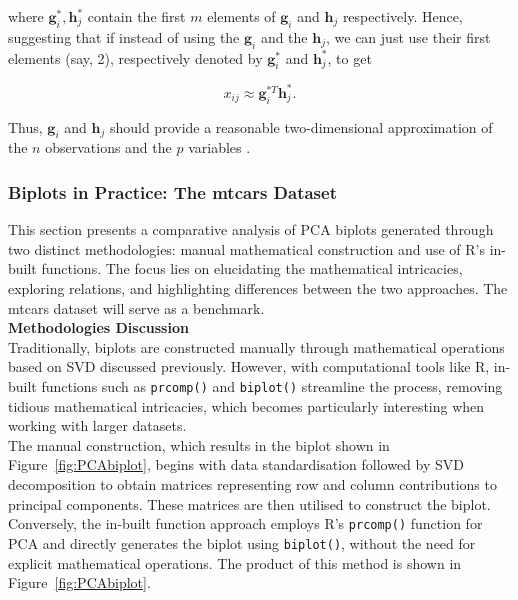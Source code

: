 \documentclass{article}\usepackage[]{graphicx}\usepackage[]{xcolor}
\numberwithin{equation}{section}
\begin{document}
\noindent where $\mathbf{g}^*_{i}, \mathbf{h}^*_{j}$ contain the first $m$ elements of $\mathbf{g}_i$ and $\mathbf{h}_j$ respectively. Hence, suggesting that if instead of using the $\mathbf{g}_i$ and the $\mathbf{h}_j$, we can just use their first elements (say, 2), respectively denoted by  $\mathbf{g}_{i}^{*}$  and  $\mathbf{h}_{j}^{*}$, to get

\[ x_{ij} \approx \mathbf{g}_{i}^{*T}\mathbf{h}_{j}^{*}.\]

\noindent Thus, $\mathbf{g}_i$ and $\mathbf{h}_j$ should provide a reasonable two-dimensional approximation of the $n$ observations and the $p$ variables \cite{jolliffe2003principal}.\\

\subsubsection{Biplots in Practice: The mtcars Dataset}

\noindent This section presents a comparative analysis of PCA biplots generated through two distinct methodologies: manual mathematical construction and use of R's in-built functions. The focus lies on elucidating the mathematical intricacies, exploring relations, and highlighting differences between the two approaches. The mtcars dataset will serve as a benchmark.\\

\noindent \textbf{Methodologies Discussion}\\
\noindent Traditionally, biplots are constructed manually through mathematical operations based on SVD discussed previously. However, with computational tools like R, in-built functions such as \texttt{prcomp()} and \texttt{biplot()} streamline the process, removing tidious mathematical intricacies, which becomes particularly interesting when working with larger datasets.\\

\noindent The manual construction, which results in the biplot shown in Figure~\ref{fig:PCAbiplot}, begins with data standardisation followed by SVD decomposition to obtain matrices representing row and column contributions to principal components. These matrices are then utilised to construct the biplot. Conversely, the in-built function approach employs R's \texttt{prcomp()} function for PCA and directly generates the biplot using \texttt{biplot()}, without the need for explicit mathematical operations. The product of this method is shown in Figure~\ref{fig:PCAbiplot}.
\end{document}
